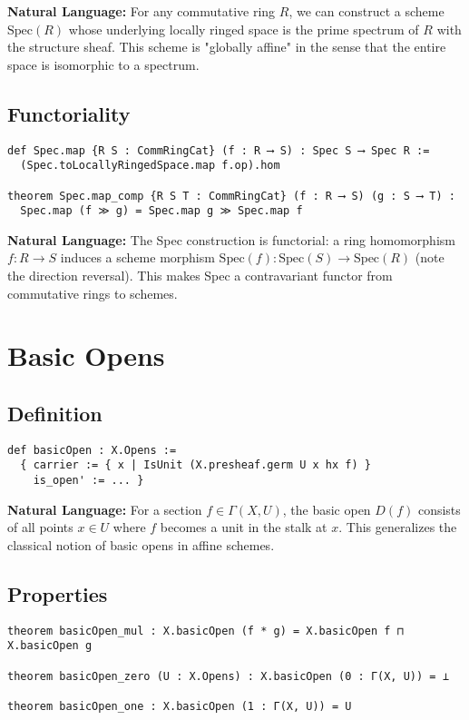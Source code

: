 \documentclass{article}
\theoremstyle{definition}
\begin{document}
\textbf{Natural Language:} For any commutative ring $R$, we can construct a scheme $\mathrm{Spec}(R)$ whose underlying locally ringed space is the prime spectrum of $R$ with the structure sheaf. This scheme is "globally affine" in the sense that the entire space is isomorphic to a spectrum.

\subsection{Functoriality}

\begin{lstlisting}
def Spec.map {R S : CommRingCat} (f : R ⟶ S) : Spec S ⟶ Spec R :=
  (Spec.toLocallyRingedSpace.map f.op).hom

theorem Spec.map_comp {R S T : CommRingCat} (f : R ⟶ S) (g : S ⟶ T) :
  Spec.map (f ≫ g) = Spec.map g ≫ Spec.map f
\end{lstlisting}

\textbf{Natural Language:} The Spec construction is functorial: a ring homomorphism $f: R \to S$ induces a scheme morphism $\mathrm{Spec}(f): \mathrm{Spec}(S) \to \mathrm{Spec}(R)$ (note the direction reversal). This makes Spec a contravariant functor from commutative rings to schemes.

\section{Basic Opens}

\subsection{Definition}

\begin{lstlisting}
def basicOpen : X.Opens :=
  { carrier := { x | IsUnit (X.presheaf.germ U x hx f) }
    is_open' := ... }
\end{lstlisting}

\textbf{Natural Language:} For a section $f \in \Gamma(X, U)$, the basic open $D(f)$ consists of all points $x \in U$ where $f$ becomes a unit in the stalk at $x$. This generalizes the classical notion of basic opens in affine schemes.

\subsection{Properties}

\begin{lstlisting}
theorem basicOpen_mul : X.basicOpen (f * g) = X.basicOpen f ⊓ X.basicOpen g

theorem basicOpen_zero (U : X.Opens) : X.basicOpen (0 : Γ(X, U)) = ⊥

theorem basicOpen_one : X.basicOpen (1 : Γ(X, U)) = U
\end{lstlisting}
\end{document}
